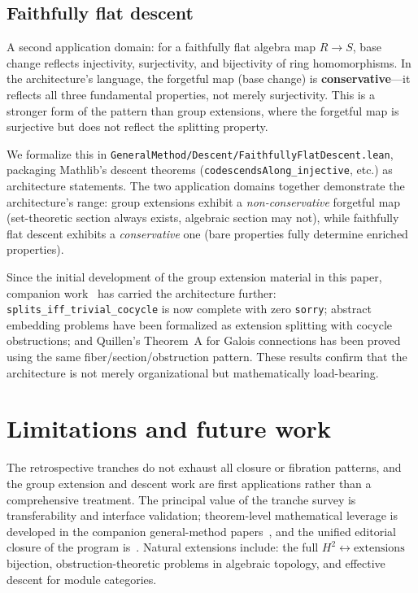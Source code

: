 \documentclass[11pt]{article}
\begin{document}
\subsection{Faithfully flat descent}\label{sec:descent}

A second application domain: for a faithfully flat algebra map $R \to S$, base change
reflects injectivity, surjectivity, and bijectivity of ring homomorphisms. In the
architecture's language, the forgetful map (base change) is \textbf{conservative}---it
reflects all three fundamental properties, not merely surjectivity. This is a stronger
form of the pattern than group extensions, where the forgetful map is surjective but does
not reflect the splitting property.

We formalize this in \texttt{GeneralMethod/Descent/FaithfullyFlatDescent.lean}, packaging
Mathlib's descent theorems (\texttt{codescendsAlong\_injective}, etc.) as architecture
statements. The two application domains together demonstrate the architecture's range:
group extensions exhibit a \emph{non-conservative} forgetful map (set-theoretic section
always exists, algebraic section may not), while faithfully flat descent exhibits a
\emph{conservative} one (bare properties fully determine enriched properties).

\noindent
Since the initial development of the group extension material in this paper, companion
work~\cite{SpivackFiber,SpivackQuillen} has carried the architecture further:
\texttt{splits\_iff\_trivial\_cocycle} is now complete with zero \texttt{sorry};
abstract embedding problems have been formalized as extension splitting with cocycle
obstructions; and Quillen's Theorem~A for Galois connections has been proved using the
same fiber/section/obstruction pattern. These results confirm that the architecture
is not merely organizational but mathematically load-bearing.

\section{Limitations and future work}\label{sec:limits}

The retrospective tranches do not exhaust all closure or fibration patterns, and the
group extension and descent work are first applications rather than a comprehensive
treatment. The principal value of the tranche survey is transferability and interface
validation; theorem-level mathematical leverage is developed in the companion
general-method papers~\cite{SpivackFiber,SpivackQuillen}, and the unified editorial
closure of the program is~\cite{SpivackSynthesis,SpivackSummit}. Natural extensions include:
the full $H^2 \leftrightarrow \text{extensions}$ bijection, obstruction-theoretic
problems in algebraic topology, and effective descent for module categories.
\end{document}

